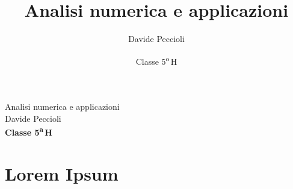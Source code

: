 \documentclass[a4paper, twoside, titlepage]{book}
\title{Analisi numerica e applicazioni}
\date{Classe 5\textsuperscript{o}\,H}
\author{Davide Peccioli}
\newcounter{i}%
\newcounter{n}%
\newcounter{I}%
\begin{document}
\begin{titlepage} %
\thispagestyle{fancy}
\begin{center}
    \null
    \vfill
    {\huge Analisi numerica e applicazioni}\\
    \vspace{3em}
    {\large Davide Peccioli}\\
    \vspace{1em}
    {\large \textbf{Classe 5\textsuperscript{a}\,H}}
    \fancyfoot[C]{}
    \vfill
\end{center}
\end{titlepage}

\fancyfoot[C]{\thepage}

\chapter{Lorem Ipsum}\thispagestyle{fancy}

\setcounter{page}{1}
\lipsum
\end{document}
